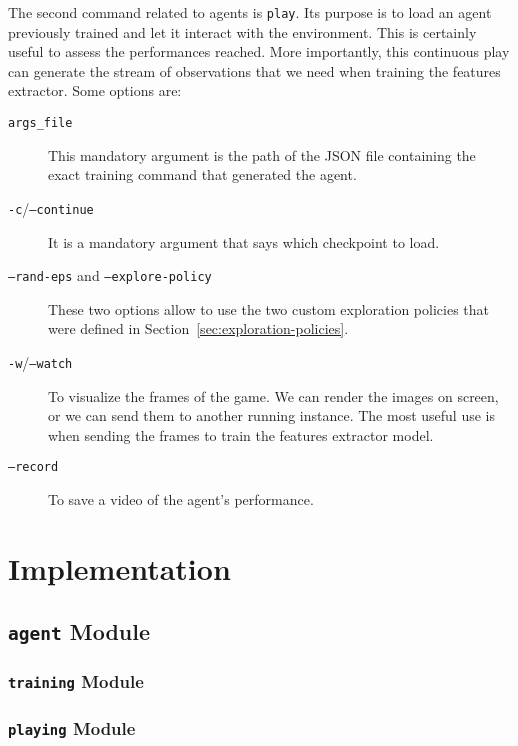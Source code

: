 The second command related to agents is \texttt{play}. Its purpose is to load
an agent previously trained and let it interact with the environment. This is
certainly useful to assess the performances reached. More importantly, this
continuous play can generate the stream of observations that we need when
training the features extractor. Some options are:
\begin{description}
	\item [\texttt{args\_file}] This mandatory argument is the path of the JSON
		file containing the exact training command that generated the agent.
	\item [\texttt{-c}/\texttt{--continue}] It is a mandatory argument that
		says which checkpoint to load.
	\item [\texttt{--rand-eps} {\normalfont and} \texttt{--explore-policy}]
		These two options allow to use the two custom exploration policies that
		were defined in Section~\ref{sec:exploration-policies}.
	\item [\texttt{-w}/\texttt{--watch}] To visualize the frames of the game.
		We can render the images on screen, or we can send them to another running
		instance. The most useful use is when sending the frames to train the
		features extractor model.
	\item [\texttt{--record}] To save a video of the agent's performance.
\end{description}


\section{Implementation}

\label{sec:implementation}

\subsection{\texttt{agent} Module}

\label{sec:impl-agent}

\subsubsection{\texttt{training} Module}
\subsubsection{\texttt{playing} Module}


